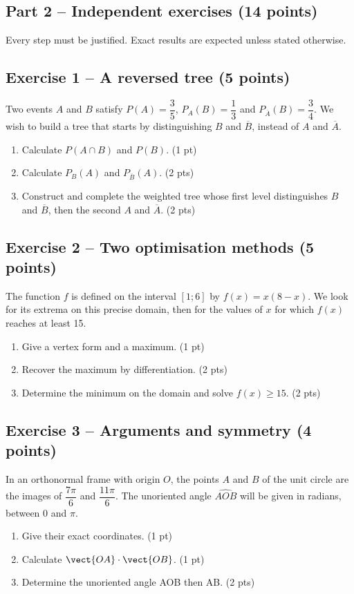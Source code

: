 \clearpage\subsection*{Part 2 -- Independent exercises (14 points)}
Every step must be justified. Exact results are expected unless stated otherwise.
\subsection*{Exercise 1 -- A reversed tree (5 points)}
Two events $A$ and $B$ satisfy $P(A)=\dfrac35$, $P_A(B)=\dfrac13$ and $P_{\overline A}(B)=\dfrac34$. We wish to build a tree that starts by distinguishing $B$ and $\overline B$, instead of $A$ and $\overline A$.
\begin{enumerate}
\item Calculate $P(A\cap B)$ and $P(B)$. \hfill(1 pt)
\item Calculate $P_B(A)$ and $P_{\overline B}(A)$. \hfill(2 pts)
\item Construct and complete the weighted tree whose first level distinguishes $B$ and $\overline B$, then the second $A$ and $\overline A$. \hfill(2 pts)
\end{enumerate}
\subsection*{Exercise 2 -- Two optimisation methods (5 points)}
The function $f$ is defined on the interval $[1;6]$ by $f(x)=x(8-x)$. We look for its extrema on this precise domain, then for the values of $x$ for which $f(x)$ reaches at least 15.
\begin{enumerate}
\item Give a vertex form and a maximum. \hfill(1 pt)
\item Recover the maximum by differentiation. \hfill(2 pts)
\item Determine the minimum on the domain and solve $f(x)\geq15$. \hfill(2 pts)
\end{enumerate}
\subsection*{Exercise 3 -- Arguments and symmetry (4 points)}
In an orthonormal frame with origin $O$, the points $A$ and $B$ of the unit circle are the images of $\dfrac{7\pi}6$ and $\dfrac{11\pi}6$. The unoriented angle $\widehat{AOB}$ will be given in radians, between 0 and $\pi$.
\begin{enumerate}
\item Give their exact coordinates. \hfill(1 pt)
\item Calculate $\vect{OA}\cdot\vect{OB}$. \hfill(1 pt)
\item Determine the unoriented angle AOB then AB. \hfill(2 pts)
\end{enumerate}
